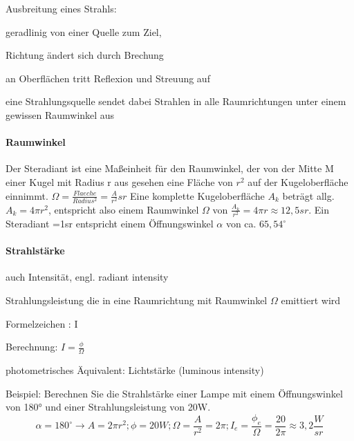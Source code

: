 \documentclass[landscape]{article}
\begin{document}
\begin{multicols}{3}
  Ausbreitung eines Strahls:
  \begin{itemize*}
    \item geradlinig von einer Quelle zum Ziel,
    \item Richtung ändert sich durch Brechung
    \item an Oberflächen tritt Reflexion und Streuung auf
    \item eine Strahlungsquelle sendet dabei Strahlen in alle Raumrichtungen unter einem gewissen Raumwinkel aus
  \end{itemize*}
  
  \paragraph{Raumwinkel}
  Der Steradiant ist eine Maßeinheit für den Raumwinkel, der von der Mitte M einer Kugel mit Radius r aus gesehen eine Fläche von $r^2$ auf der Kugeloberfläche einnimmt. $\Omega=\frac{Flaeche}{Radius^2}=\frac{A}{r^2}sr$
  Eine komplette Kugeloberfläche $A_k$ beträgt allg. $A_k = 4\pi r^2$, entspricht also einem Raumwinkel $\Omega$ von $\frac{A_k}{r^2}= 4\pi r\approx 12,5sr$. Ein Steradiant =1sr entspricht einem Öffnungswinkel $\alpha$ von ca. $65,54^{\circ}$
  
  \paragraph{Strahlstärke}
  \begin{itemize*}
    \item auch Intensität, engl. radiant intensity
    \item Strahlungsleistung die in eine Raumrichtung mit Raumwinkel $\Omega$ emittiert wird
    \item Formelzeichen : I
    \item Berechnung: $I=\frac{\phi}{\Omega}$
    \item photometrisches Äquivalent: Lichtstärke (luminous intensity)
  \end{itemize*}
  
  Beispiel: Berechnen Sie die Strahlstärke einer Lampe mit einem Öffnungswinkel von 180° und einer Strahlungsleistung von 20W.
  $$\alpha=180^{\circ}\rightarrow A=2\pi r^2; \phi =20W; \Omega=\frac{A}{r^2}=2\pi ; I_e=\frac{\phi_e}{\Omega}=\frac{20}{2\pi}\approx 3,2 \frac{W}{sr}$$
  

\end{multicols}
\end{document}
